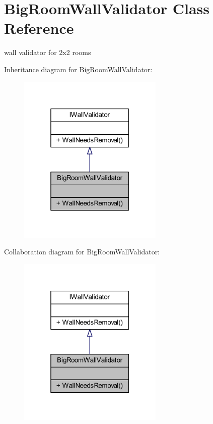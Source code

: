 \hypertarget{class_big_room_wall_validator}{}\section{Big\+Room\+Wall\+Validator Class Reference}
\label{class_big_room_wall_validator}


wall validator for 2x2 rooms  




Inheritance diagram for Big\+Room\+Wall\+Validator\+:\nopagebreak
\begin{figure}[H]
\begin{center}
\leavevmode
\includegraphics[width=196pt]{class_big_room_wall_validator__inherit__graph}
\end{center}
\end{figure}


Collaboration diagram for Big\+Room\+Wall\+Validator\+:\nopagebreak
\begin{figure}[H]
\begin{center}
\leavevmode
\includegraphics[width=196pt]{class_big_room_wall_validator__coll__graph}
\end{center}
\end{figure}

